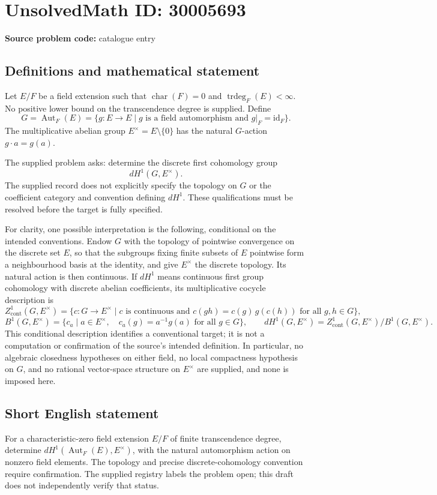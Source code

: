 \documentclass[11pt]{article}
\begin{document}
\section*{UnsolvedMath ID: 30005693}
\textbf{Source problem code:} catalogue entry
\subsection{Definitions and mathematical statement}
Let \(E/F\) be a field extension such that \(\operatorname{char}(F)=0\) and \(\operatorname{trdeg}_F(E)<\infty\). No positive lower bound on the transcendence degree is supplied. Define
\[
G=\operatorname{Aut}_F(E)
 =\{g:E\longrightarrow E\mid g\text{ is a field automorphism and }g|_F=\mathrm{id}_F\}.
\]
The multiplicative abelian group \(E^\times=E\setminus\{0\}\) has the natural \(G\)-action \(g\cdot a=g(a)\).

The supplied problem asks: determine the discrete first cohomology group
\[
 dH^1(G,E^\times).
\]
The supplied record does not explicitly specify the topology on \(G\) or the coefficient category and convention defining \(dH^1\). These qualifications must be resolved before the target is fully specified.

For clarity, one possible interpretation is the following, conditional on the intended conventions. Endow \(G\) with the topology of pointwise convergence on the discrete set \(E\), so that the subgroups fixing finite subsets of \(E\) pointwise form a neighbourhood basis at the identity, and give \(E^\times\) the discrete topology. Its natural action is then continuous. If \(dH^1\) means continuous first group cohomology with discrete abelian coefficients, its multiplicative cocycle description is
\[
 Z^1_{\mathrm{cont}}(G,E^\times)
 =\{c:G\longrightarrow E^\times\mid c\text{ is continuous and }
 c(gh)=c(g)\,g(c(h))\text{ for all }g,h\in G\},
\]
\[
 B^1(G,E^\times)
 =\{c_a\mid a\in E^\times,\quad c_a(g)=a^{-1}g(a)\text{ for all }g\in G\},
 \qquad
 dH^1(G,E^\times)=Z^1_{\mathrm{cont}}(G,E^\times)/B^1(G,E^\times).
\]
This conditional description identifies a conventional target; it is not a computation or confirmation of the source's intended definition. In particular, no algebraic closedness hypotheses on either field, no local compactness hypothesis on \(G\), and no rational vector-space structure on \(E^\times\) are supplied, and none is imposed here.
\subsection{Short English statement}
For a characteristic-zero field extension \(E/F\) of finite transcendence degree, determine \(dH^1(\operatorname{Aut}_F(E),E^\times)\), with the natural automorphism action on nonzero field elements. The topology and precise discrete-cohomology convention require confirmation. The supplied registry labels the problem open; this draft does not independently verify that status.
\end{document}
